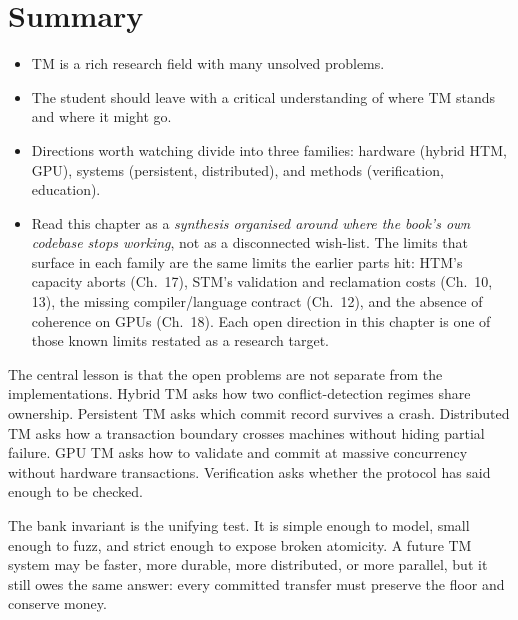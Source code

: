 \section{Summary}
\begin{itemize}
    \item TM is a rich research field with many unsolved problems.
    \item The student should leave with a critical understanding of where TM stands and where it might go.
    \item Directions worth watching divide into three families: hardware (hybrid HTM, GPU), systems (persistent, distributed), and methods (verification, education).
    \item Read this chapter as a \emph{synthesis organised around where the book's own codebase stops working}, not as a disconnected wish-list. The limits that surface in each family are the same limits the earlier parts hit: HTM's capacity aborts (Ch.~17), STM's validation and reclamation costs (Ch.~10, 13), the missing compiler/language contract (Ch.~12), and the absence of coherence on GPUs (Ch.~18). Each open direction in this chapter is one of those known limits restated as a research target.
\end{itemize}

The central lesson is that the open problems are not separate from the implementations. Hybrid TM asks how two conflict-detection regimes share ownership. Persistent TM asks which commit record survives a crash. Distributed TM asks how a transaction boundary crosses machines without hiding partial failure. GPU TM asks how to validate and commit at massive concurrency without hardware transactions. Verification asks whether the protocol has said enough to be checked.

The bank invariant is the unifying test. It is simple enough to model, small enough to fuzz, and strict enough to expose broken atomicity. A future TM system may be faster, more durable, more distributed, or more parallel, but it still owes the same answer: every committed transfer must preserve the floor and conserve money.

